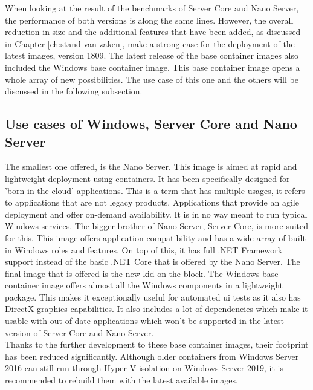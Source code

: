  When looking at the result of the benchmarks of Server Core and Nano Server, the performance of both versions is along the same lines. 
 However, the overall reduction in size and the additional features that have been added, as discussed in Chapter \ref{ch:stand-van-zaken}, make a strong case for the deployment of the latest images, version 1809. 
 The latest release of the base container images also included the Windows base container image. 
 This base container image opens a whole array of new possibilities. 
 The use case of this one and the others will be discussed in the following subsection.

\subsection{Use cases of Windows, Server Core and Nano Server}
The smallest one offered, is the Nano Server. 
This image is aimed at rapid and lightweight deployment using containers. 
It has been specifically designed for 'born in the cloud' applications. 
This is a term that has multiple usages, it refers to applications that are not legacy products. 
Applications that provide an agile deployment and offer on-demand availability. 
It is in no way meant to run typical Windows services. 
The bigger brother of Nano Server, Server Core, is more suited for this. 
This image offers application compatibility and has a wide array of built-in Windows roles and features. 
On top of this, it has full .NET Framework support instead of the basic .NET Core that is offered by the Nano Server. 
The final image that is offered is the new kid on the block. 
The Windows base container image offers almost all the Windows components in a lightweight package. 
This makes it exceptionally useful for automated \acrshort{ui} tests as it also has DirectX graphics capabilities. 
It also includes a lot of dependencies which make it usable with out-of-date applications which won't be supported in the latest version of Server Core and Nano Server. 
\\
Thanks to the further development to these base container images, their footprint has been reduced significantly. 
Although older containers from Windows Server 2016 can still run through Hyper-V isolation on Windows Server 2019, it is recommended to rebuild them with the latest available images.




